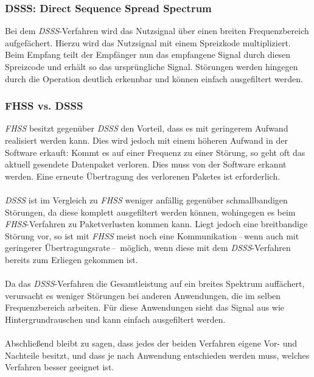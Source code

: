         \subsubsection{DSSS: Direct Sequence Spread Spectrum}\label{DSSS}
            Bei dem \textsl{DSSS}-Verfahren wird das Nutzsignal über einen breiten Frequenzbereich
            aufgefächert. Hierzu wird das Nutzsignal mit einem Spreizkode multipliziert. 
            Beim Empfang teilt der Empfänger nun das empfangene Signal durch diesen Spreizcode
            und erhält so das ursprüngliche Signal. Störungen werden hingegen durch die 
            Operation deutlich erkennbar und können einfach ausgefiltert werden.
            \cite{RC-Network} \cite{ZigBeeFarahani}
        \subsubsection{FHSS vs. DSSS}\label{FHSSvsDSSS}
            \textsl{FHSS} besitzt gegenüber \textsl{DSSS} den Vorteil, dass es mit geringerem Aufwand
            realisiert werden kann. 
            Dies wird jedoch mit einem höheren Aufwand in der Software erkauft: Kommt es auf einer
            Frequenz zu einer Störung, so geht oft das aktuell gesendete Datenpaket verloren.
            Dies muss von der Software erkannt werden. Eine erneute Übertragung des verlorenen
            Paketes ist erforderlich.\\
            \\
            \textsl{DSSS} ist im Vergleich zu \textsl{FHSS} weniger anfällig gegenüber
            schmallbandigen Störungen, da diese komplett ausgefiltert werden können, 
            wohingegen es beim \textsl{FHSS}-Verfahren zu Paketverlusten kommen kann.
            Liegt jedoch eine breitbandige Störung vor, so ist mit \textsl{FHSS}
            meist noch eine Kommunikation\,--\,wenn auch mit geringerer Übertragungsrate\,--\,
            möglich, wenn diese mit dem \textsl{DSSS}-Verfahren bereits zum Erliegen gekommen ist.\\
            \\
            Da das \textsl{DSSS}-Verfahren die Gesamtleistung auf ein breites Spektrum auffächert,
            verursacht es weniger Störungen bei anderen Anwendungen, die im selben Frequenzbereich
            arbeiten. Für diese Anwendungen sieht das Signal aus wie Hintergrundrauschen und kann
            einfach ausgefiltert werden.\\
            \\
            Abschließend bleibt zu sagen, dass jedes der beiden Verfahren eigene Vor- und Nachteile
            besitzt, und dass je nach Anwendung entschieden werden muss, welches Verfahren
            besser geeignet ist.

